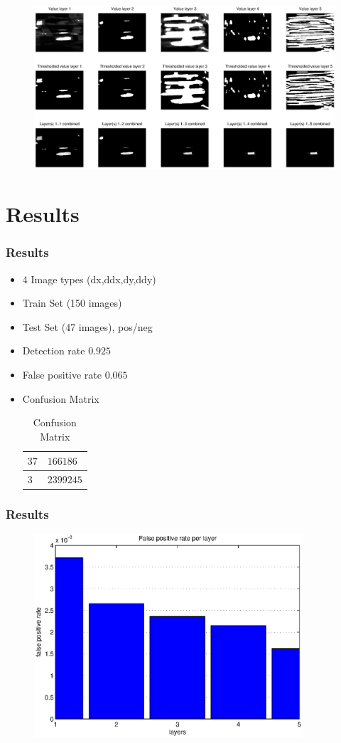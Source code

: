 \documentclass{beamer}
\begin{document}
\frame
{
	\begin{figure}[!ht]
	\centering
	\includegraphics[width=12cm]{../report/img/cascader_img14}
	\label{fig:cascader}
	\end{figure}
}

\section{Results}
\frame
{
  \frametitle{Results}
	
  \begin{itemize}
  \item <+-| alert@+> 4 Image types (dx,ddx,dy,ddy)
  \item <+-| alert@+> Train Set (150 images)
  \item <+-| alert@+> Test Set (47 images), pos/neg
  \item <+-| alert@+> Detection rate $0.925$
  \item <+-| alert@+> False positive rate $0.065$
  \item <+-| alert@+> Confusion Matrix
  \begin{table}[!ht]
  \centering
  \begin{tabular}{|l|l|}
  \hline
  $37$ & $166186$ \\
  \hline
  $3$  & $2399245$ \\
  \hline
  \end{tabular}
  \caption{Confusion Matrix}
  \label{tab:conf}
  \end{table}
  \end{itemize}
}

\frame
{
  \frametitle{Results}
  \begin{figure}[!ht]
  \centering
  \includegraphics[width=10cm]{../report/img/fprate}
  \end{figure}
}
\end{document}
